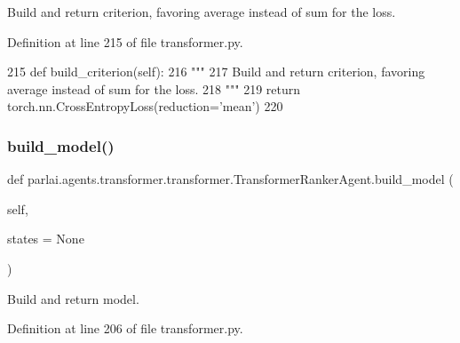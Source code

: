 \begin{DoxyVerb}Build and return criterion, favoring average instead of sum for the loss.
\end{DoxyVerb}
 

Definition at line 215 of file transformer.\+py.


\begin{DoxyCode}
215     \textcolor{keyword}{def }build\_criterion(self):
216         \textcolor{stringliteral}{"""}
217 \textcolor{stringliteral}{        Build and return criterion, favoring average instead of sum for the loss.}
218 \textcolor{stringliteral}{        """}
219         \textcolor{keywordflow}{return} torch.nn.CrossEntropyLoss(reduction=\textcolor{stringliteral}{'mean'})
220 
\end{DoxyCode}
\mbox{\label{classparlai_1_1agents_1_1transformer_1_1transformer_1_1TransformerRankerAgent_a3336fdab2d667e6e631135ec70e8558f}} 
\subsubsection{\texorpdfstring{build\+\_\+model()}{build\_model()}}
{\footnotesize\ttfamily def parlai.\+agents.\+transformer.\+transformer.\+Transformer\+Ranker\+Agent.\+build\+\_\+model (\begin{DoxyParamCaption}\item[{}]{self,  }\item[{}]{states = {\ttfamily None} }\end{DoxyParamCaption})}

\begin{DoxyVerb}Build and return model.
\end{DoxyVerb}
 

Definition at line 206 of file transformer.\+py.


